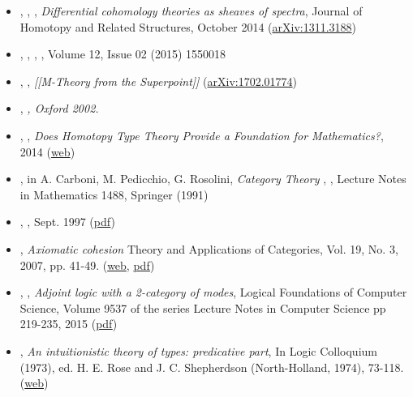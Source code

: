 \begin{itemize}%
\item {}, , , \emph{Differential cohomology theories as sheaves of spectra}, Journal of Homotopy and Related Structures, October 2014 (\href{http://arxiv.org/abs/1311.3188}{arXiv:1311.3188})
\item {}, , , , Volume 12, Issue 02 (2015) 1550018
\item {}, , \emph{[[M-Theory from the Superpoint]]} (\href{https://arxiv.org/abs/1702.01774}{arXiv:1702.01774})
\item {}, \emph{, Oxford 2002.}
\item {}, , \emph{Does Homotopy Type Theory Provide a Foundation for Mathematics?}, 2014 (\href{http://philsci-archive.pitt.edu/11143/}{web})
\item {},  in A. Carboni, M. Pedicchio, G. Rosolini, \emph{Category Theory} , , Lecture Notes in Mathematics 1488, Springer (1991)
\item {}, , Sept. 1997 (\href{http://www.acsu.buffalo.edu/~wlawvere/ToposMotion.pdf}{pdf})
\item {}, \emph{Axiomatic cohesion} Theory and Applications of Categories, Vol. 19, No. 3, 2007, pp. 41-49. (\href{http://www.tac.mta.ca/tac/volumes/19/3/19-03abs.html}{web}, \href{http://www.tac.mta.ca/tac/volumes/19/3/19-03.pdf}{pdf})
\item {}, , \emph{Adjoint logic with a 2-category of modes}, Logical Foundations of Computer Science, Volume 9537 of the series Lecture Notes in Computer Science pp 219-235, 2015 (\href{http://dlicata.web.wesleyan.edu/pubs/ls15adjoint/ls15adjoint.pdf}{pdf})
\item {}, \emph{An intuitionistic theory of types: predicative part}, In Logic Colloquium (1973), ed. H. E. Rose and J. C. Shepherdson (North-Holland, 1974), 73-118. (\href{http://citeseerx.ist.psu.edu/viewdoc/summary?doi=10.1.1.131.926}{web})

\end{itemize}
